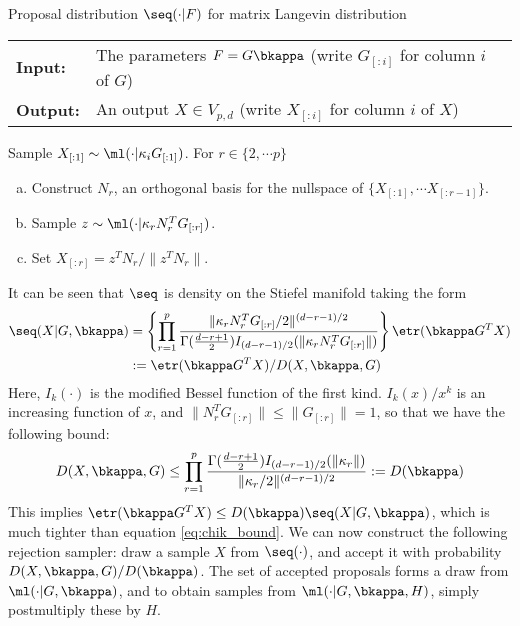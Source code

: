 {
\vspace{.1in}
\begin{algorithm}[H]
\caption{Proposal distribution $\seq(\cdot|F)$ for matrix Langevin distribution \citep{hoff2009}}\label{alg:rej_smplr}
\begin{tabular}{p{1.4cm}p{12.2cm}}
\textbf{Input:}  & The parameters $ F = G\bkappa$ (write $G_{[:i]}$ for column $i$ of $G$) \\
\textbf{Output:} & An output  $X \in V_{p,d}$ (write $X_{[:i]}$ for column $i$ of $X$) \\
\hline
\end{tabular}
\begin{algorithmic}[1]
  \STATE Sample $X_{[:1]} \sim \ml(\cdot|\kappa_i G_{[:1]})$.
  \STATE For $r \in \{2,\cdots p\}$
  \begin{enumerate}[(a)]
    \item Construct $N_r$, an orthogonal basis for the nullspace of $\{X_{[:1]},\cdots X_{[:r-1]} \}$.
    \item Sample $z \sim \ml(\cdot|\kappa_r N^T_r G_{[:r]})$.
    \item Set $X_{[:r]} = z^T N_r/ \|z^T N_r\| $.
  \end{enumerate}
\end{algorithmic}
\end{algorithm}
}

It can be seen that $\seq$ is density on the Stiefel manifold taking the form
\begin{align}
  \seq(X|G, \bkappa) &= \left\{\prod_{r=1}^p \frac{ \|\kappa_r N^T_r G_{[:r]}/2 \|^{(d-r-1)/2 }}{ \Gamma(\frac{d-r+1}{2} ) I_{(d-r-1)/2}(\| \kappa_r N^T_r G_{[:r]} \|)} \right\} \etr(\bkappa G^T X) \label{eq:hoff_seq}\\
               &:= \etr(\bkappa G^T X)/D(X, \bkappa, G) \nonumber
\end{align}
Here, $I_k(\cdot)$ is the modified Bessel function of the first kind. $I_k(x)/x^k$ is an increasing function of $x$,
and  $\|N^T_r G_{[:r]}\| \le \|G_{[:r]}\| = 1$, so that we have the following bound:
\begin{align}
 D(X,\bkappa, G) \le \prod_{r=1}^p  \frac{ \Gamma(\frac{d-r+1}{2} ) I_{(d-r-1)/2}(\| \kappa_r \|)}{ \|\kappa_r/2 \|^{(d-r-1)/2 }} := D(\bkappa) \nonumber
\end{align}
This implies $\etr(\bkappa G^T X) \le D(\bkappa) \seq(X|G,\bkappa) $, which is much tighter than equation \eqref{eq:chik_bound}. %
We can now construct the following rejection sampler: draw a sample $X$ from $\seq(\cdot)$, and accept it with probability
$D(X, \bkappa, G)/D(\bkappa)$. The set of accepted proposals forms a draw from $\ml(\cdot|G,\bkappa)$, and to obtain samples from $\ml(\cdot|G,\bkappa,H)$,
simply postmultiply these by $H$.


